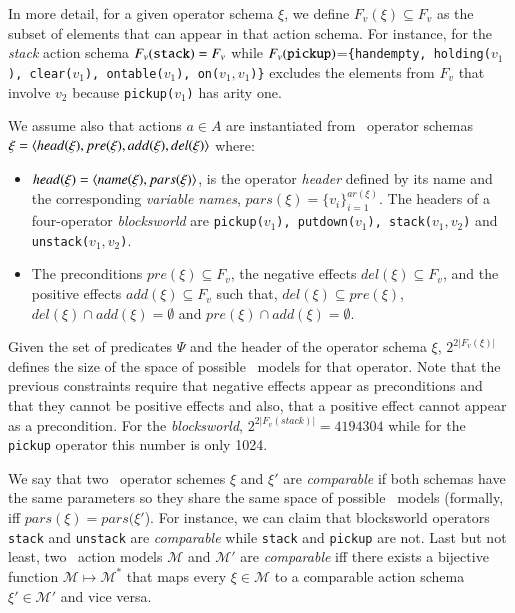 In more detail, for a given operator schema $\xi$, we define $F_v(\xi)\subseteq F_v$ as the subset of elements that can appear in that action schema. For instance, for the {\em stack} action schema $F_v({\tt stack})=F_v$ while $F_v({\tt pickup})$={\small\tt\{handempty, holding($v_1$), clear($v_1$), ontable($v_1$), on($v_1,v_1$)\}} excludes the elements from $F_v$ that involve $v_2$ because {\small\tt pickup($v_1$)} has arity one.

We assume also that actions $a\in A$ are instantiated from \strips\ operator schemas $\xi={\langle head(\xi),pre(\xi),add(\xi),del(\xi) \rangle}$ where:
\begin{itemize}
\item $head(\xi)={\langle name(\xi),pars(\xi) \rangle}$, is the operator {\em header} defined by its name and the corresponding {\em variable names}, $pars(\xi)=\{v_i\}_{i=1}^{ar(\xi)}$. The headers of a four-operator {\em blocksworld} are {\small\tt pickup($v_1$), putdown($v_1$), stack($v_1,v_2$)} and {\small\tt unstack($v_1,v_2$)}.
\item The preconditions $pre(\xi)\subseteq F_v$, the negative effects $del(\xi)\subseteq F_v$, and the positive effects $add(\xi)\subseteq F_v$ such that, $del(\xi)\subseteq pre(\xi)$, $del(\xi)\cap add(\xi)=\emptyset$ and $pre(\xi)\cap add(\xi)=\emptyset$.
\end{itemize}
Given the set of predicates $\Psi$ and the header of the operator schema $\xi$, $2^{2|F_v(\xi)|}$ defines the size of the space of possible \strips\ models for that operator. Note that the previous constraints require that negative effects appear as preconditions and that they cannot be positive effects and also, that a positive effect cannot appear as a precondition. For the {\em blocksworld}, $2^{2|F_v(stack)|}=4194304$ while for the {\tt pickup} operator this number is only 1024.

We say that two \strips\ operator schemes $\xi$ and $\xi'$ are {\em comparable} if both schemas have the same parameters so they share the same space of possible \strips\ models (formally, iff $pars(\xi)=pars(\xi'$). For instance, we can claim that blocksworld operators {\tt stack} and {\tt unstack} are {\em comparable} while  {\tt stack} and {\tt pickup} are not. Last but not least, two \strips\ action models $\mathcal{M}$ and $\mathcal{M}'$ are {\em comparable} iff there exists a bijective function $\mathcal{M} \mapsto \mathcal{M}^*$ that maps every $\xi\in\mathcal{M}$ to a comparable action schema $\xi'\in\mathcal{M'}$ and vice versa.


